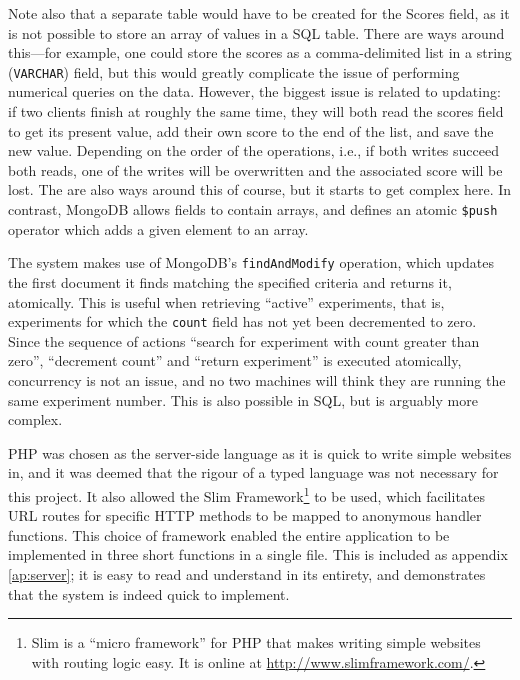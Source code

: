 Note also that a separate table would have to be created for the Scores field, as it is not possible to store an array of values in a SQL table.  There are ways around this---for example, one could store the scores as a comma-delimited list in a string ({\tt VARCHAR}) field, but this would greatly complicate the issue of performing numerical queries on the data.  However, the biggest issue is related to updating: if two clients finish at roughly the same time, they will both read the scores field to get its present value, add their own score to the end of the list, and save the new value.  Depending on the order of the operations, i.e., if both writes succeed both reads, one of the writes will be overwritten and the associated score will be lost.  The are also ways around this of course, but it starts to get complex here.  In contrast, MongoDB allows fields to contain arrays, and defines an atomic {\tt\$push} operator which adds a given element to an array.



The system makes use of MongoDB's {\tt findAndModify} operation, which updates the first document it finds matching the specified criteria and returns it, atomically.  This is useful when retrieving ``active'' experiments, that is, experiments for which the {\tt count} field has not yet been decremented to zero.  Since the sequence of actions ``search for experiment with count greater than zero'', ``decrement count'' and ``return experiment'' is executed atomically, concurrency is not an issue, and no two machines will think they are running the same experiment number.  This is also possible in SQL, but is arguably more complex.

PHP was chosen as the server-side language as it is quick to write simple websites in, and it was deemed that the rigour of a typed language was not necessary for this project.  It also allowed the Slim Framework\footnote{Slim is a ``micro framework'' for PHP that makes writing simple websites with routing logic easy.  It is online at \url{http://www.slimframework.com/}.} to be used, which facilitates URL routes for specific HTTP methods to be mapped to anonymous handler functions.  This choice of framework enabled the entire application to be implemented in three short functions in a single file.  This is included as appendix \ref{ap:server}; it is easy to read and understand in its entirety, and demonstrates that the system is indeed quick to implement.

